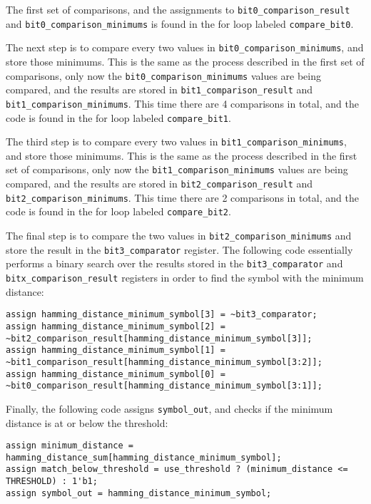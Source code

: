 The first set of comparisons, and the assignments to \texttt{bit0\_comparison\_result} and \texttt{bit0\_comparison\_minimums} is found in the for loop labeled \texttt{compare\_bit0}.

The next step is to compare every two values in \texttt{bit0\_comparison\_minimums}, and store those minimums. This is the same as the process described in the first set of comparisons, only now the \texttt{bit0\_comparison\_minimums} values are being compared, and the results are stored in \texttt{bit1\_comparison\_result} and \texttt{bit1\_comparison\_min\-i\-mums}. This time there are 4 comparisons in total, and the code is found in the for loop labeled \texttt{compare\_bit1}.

The third step is to compare every two values in \texttt{bit1\_comparison\_minimums}, and store those minimums. This is the same as the process described in the first set of comparisons, only now the \texttt{bit1\_comparison\_minimums} values are being compared, and the results are stored in \texttt{bit2\_comparison\_result} and \texttt{bit2\_comparison\_min\-i\-mums}. This time there are 2 comparisons in total, and the code is found in the for loop labeled \texttt{compare\_bit2}.

The final step is to compare the two values in \texttt{bit2\_comparison\_minimums} and store the result in the \texttt{bit3\_comparator} register. The following code essentially performs a binary search over the results stored in the \texttt{bit3\_co\-m\-parator} and \texttt{bitx\_comparison\_result} registers in order to find the symbol with the minimum distance:

\begin{lstlisting}
assign hamming_distance_minimum_symbol[3] = ~bit3_comparator;
assign hamming_distance_minimum_symbol[2] = ~bit2_comparison_result[hamming_distance_minimum_symbol[3]];
assign hamming_distance_minimum_symbol[1] = ~bit1_comparison_result[hamming_distance_minimum_symbol[3:2]];
assign hamming_distance_minimum_symbol[0] = ~bit0_comparison_result[hamming_distance_minimum_symbol[3:1]];
\end{lstlisting}
Finally, the following code assigns \texttt{symbol\_out}, and checks if the minimum distance is at or below the threshold:

\begin{lstlisting}
assign minimum_distance = hamming_distance_sum[hamming_distance_minimum_symbol];
assign match_below_threshold = use_threshold ? (minimum_distance <= THRESHOLD) : 1'b1;
assign symbol_out = hamming_distance_minimum_symbol;
\end{lstlisting}

